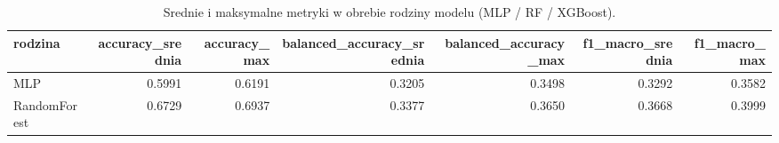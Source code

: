 \begin{table}
\caption{Srednie i maksymalne metryki w obrebie rodziny modelu (MLP / RF / XGBoost).}
\label{tab:agregaty}
\begin{tabular}{lrrrrrr}
\toprule
rodzina & accuracy\_srednia & accuracy\_max & balanced\_accuracy\_srednia & balanced\_accuracy\_max & f1\_macro\_srednia & f1\_macro\_max \\
\midrule
MLP & 0.5991 & 0.6191 & 0.3205 & 0.3498 & 0.3292 & 0.3582 \\
RandomForest & 0.6729 & 0.6937 & 0.3377 & 0.3650 & 0.3668 & 0.3999 \\
\bottomrule
\end{tabular}
\end{table}
